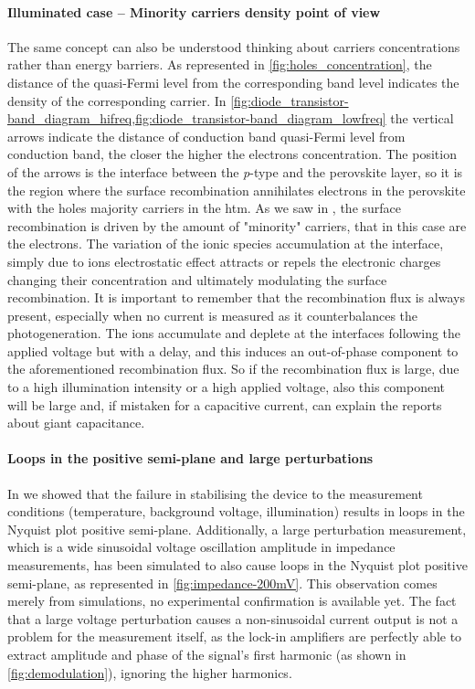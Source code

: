 	\paragraph{Illuminated case -- Minority carriers density point of view}
The same concept can also be understood thinking about carriers concentrations rather than energy barriers.
As represented in \cref{fig:holes_concentration}, the distance of the quasi\hyp{}Fermi level from the corresponding band level indicates the density of the corresponding carrier.
In \cref{fig:diode_transistor-band_diagram_hifreq,fig:diode_transistor-band_diagram_lowfreq} the vertical arrows indicate the distance of conduction band quasi\hyp{}Fermi level from conduction band, the closer the higher the electrons concentration.
The position of the arrows is the interface between the \textit{p}-type and the perovskite layer, so it is the region where the surface recombination annihilates electrons in the perovskite with the holes majority carriers in the \gls{htm}.
As we saw in , the surface recombination is driven by the amount of "minority" carriers, that in this case are the electrons.
The variation of the ionic species accumulation at the interface, simply due to ions electrostatic effect attracts or repels the electronic charges changing their concentration and ultimately modulating the surface recombination.
It is important to remember that the recombination flux is always present, especially when no current is measured as it counterbalances the photogeneration.
The ions accumulate and deplete at the interfaces following the applied voltage but with a delay, and this induces an out\hyp{}of\hyp{}phase component to the aforementioned recombination flux.
So if the recombination flux is large, due to a high illumination intensity or a high applied voltage, also this component will be large and, if mistaken for a capacitive current, can explain the reports about giant capacitance.
	



	\paragraph{Loops in the positive semi-plane and large perturbations}\label{impedance-large_perturbations}
		In  we showed that the failure in stabilising the device to the measurement conditions (temperature, background voltage, illumination) results in loops in the Nyquist plot positive semi\hyp{}plane.
		Additionally, a large perturbation measurement, which is a wide sinusoidal voltage oscillation amplitude in impedance measurements, has been simulated to also cause loops in the Nyquist plot positive semi\hyp{}plane, as represented in \cref{fig:impedance-200mV}.
		This observation comes merely from simulations, no experimental confirmation is available yet.
The fact that a large voltage perturbation causes a non\hyp{}sinusoidal current output is not a problem for the measurement itself, as the lock-in amplifiers are perfectly able to extract amplitude and phase of the signal's first harmonic (as shown in \cref{fig:demodulation}), ignoring the higher harmonics.


